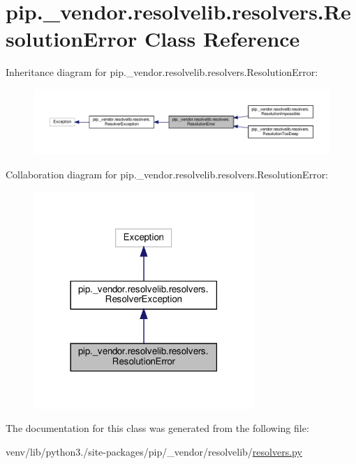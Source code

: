 \hypertarget{classpip_1_1__vendor_1_1resolvelib_1_1resolvers_1_1ResolutionError}{}\section{pip.\+\_\+vendor.\+resolvelib.\+resolvers.\+Resolution\+Error Class Reference}
\label{classpip_1_1__vendor_1_1resolvelib_1_1resolvers_1_1ResolutionError}


Inheritance diagram for pip.\+\_\+vendor.\+resolvelib.\+resolvers.\+Resolution\+Error\+:
\nopagebreak
\begin{figure}[H]
\begin{center}
\leavevmode
\includegraphics[width=350pt]{classpip_1_1__vendor_1_1resolvelib_1_1resolvers_1_1ResolutionError__inherit__graph}
\end{center}
\end{figure}


Collaboration diagram for pip.\+\_\+vendor.\+resolvelib.\+resolvers.\+Resolution\+Error\+:
\nopagebreak
\begin{figure}[H]
\begin{center}
\leavevmode
\includegraphics[width=237pt]{classpip_1_1__vendor_1_1resolvelib_1_1resolvers_1_1ResolutionError__coll__graph}
\end{center}
\end{figure}


The documentation for this class was generated from the following file\+:\begin{DoxyCompactItemize}
\item 
venv/lib/python3./site-\/packages/pip/\+\_\+vendor/resolvelib/\hyperlink{resolvers_8py}{resolvers.\+py}\end{DoxyCompactItemize}
